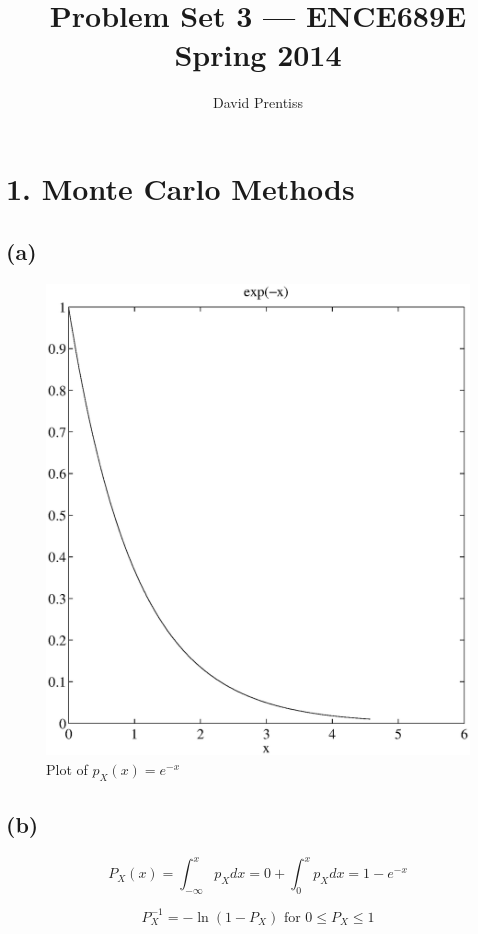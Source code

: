 \documentclass[fleqn, letterpaper]{tufte-handout}
\title{Problem Set 3 --- ENCE689E Spring 2014}
\author{David Prentiss}
\begin{document}
\maketitle

\section{1. Monte Carlo Methods}
\subsection{(a)}
\begin{figure}
        \includegraphics[width=\textwidth]{problem1a}
        \caption{Plot of $p_X(x)=e^{-x}$}
        \label{exprnd}
\end{figure}

\subsection{(b)}
\[
        P_X(x) = \int_{-\infty}^x p_X dx
        = 0 + \int_0^x p_X dx = 1 - e^{-x}
\]

\[
        P^{-1}_X = -\ln(1-P_X) \text{ for } 0 \leq P_X \leq 1
\]
\end{document}

